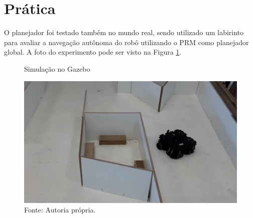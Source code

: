 \section{Prática}

O planejador foi testado também no mundo real, sendo utilizado um labirinto para avaliar a navegação autônoma do robô utilizando o PRM como planejador global. A foto do experimento pode ser visto na Figura \ref{fig:pratica}.

\begin{figure} [h!]	
    \centering
    \caption{Simulação no Gazebo}
    \includegraphics[width=1\textwidth]{Figures/Screenshot from 2021-12-19 13-13-10.png}
    \caption*{Fonte: Autoria própria.}
    \label{fig:pratica}
 \end{figure}